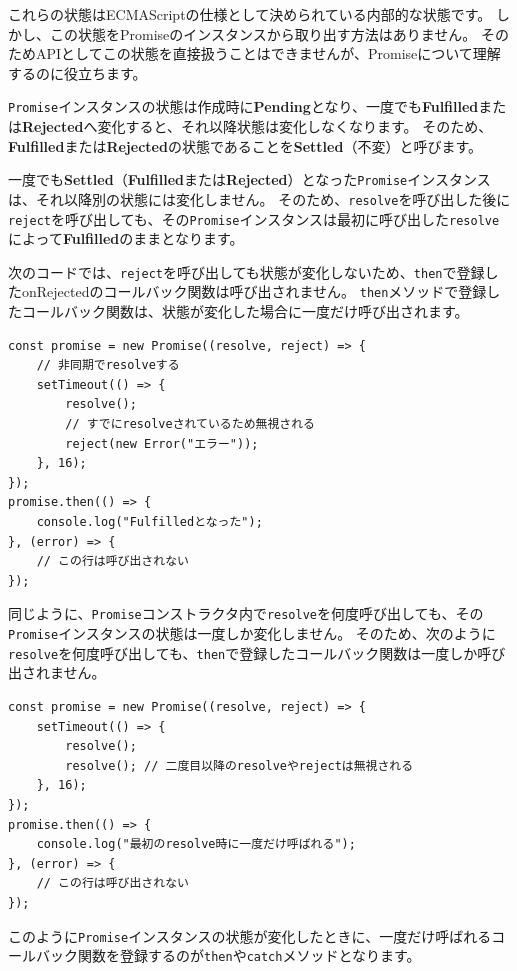 これらの状態はECMAScriptの仕様として決められている内部的な状態です。
しかし、この状態をPromiseのインスタンスから取り出す方法はありません。
そのためAPIとしてこの状態を直接扱うことはできませんが、Promiseについて理解するのに役立ちます。

\texttt{Promise}インスタンスの状態は作成時に\textbf{Pending}となり、一度でも\textbf{Fulfilled}または\textbf{Rejected}へ変化すると、それ以降状態は変化しなくなります。
そのため、\textbf{Fulfilled}または\textbf{Rejected}の状態であることを\textbf{Settled}（不変）と呼びます。

一度でも\textbf{Settled}（\textbf{Fulfilled}または\textbf{Rejected}）となった\texttt{Promise}インスタンスは、それ以降別の状態には変化しません。
そのため、\texttt{resolve}を呼び出した後に\texttt{reject}を呼び出しても、その\texttt{Promise}インスタンスは最初に呼び出した\texttt{resolve}によって\textbf{Fulfilled}のままとなります。

次のコードでは、\texttt{reject}を呼び出しても状態が変化しないため、\texttt{then}で登録したonRejectedのコールバック関数は呼び出されません。
\texttt{then}メソッドで登録したコールバック関数は、状態が変化した場合に一度だけ呼び出されます。

\begin{lstlisting}
const promise = new Promise((resolve, reject) => {
    // 非同期でresolveする
    setTimeout(() => {
        resolve();
        // すでにresolveされているため無視される
        reject(new Error("エラー"));
    }, 16);
});
promise.then(() => {
    console.log("Fulfilledとなった");
}, (error) => {
    // この行は呼び出されない
});
\end{lstlisting}

同じように、\texttt{Promise}コンストラクタ内で\texttt{resolve}を何度呼び出しても、その\texttt{Promise}インスタンスの状態は一度しか変化しません。
そのため、次のように\texttt{resolve}を何度呼び出しても、\texttt{then}で登録したコールバック関数は一度しか呼び出されません。

\begin{lstlisting}
const promise = new Promise((resolve, reject) => {
    setTimeout(() => {
        resolve();
        resolve(); // 二度目以降のresolveやrejectは無視される
    }, 16);
});
promise.then(() => {
    console.log("最初のresolve時に一度だけ呼ばれる");
}, (error) => {
    // この行は呼び出されない
});
\end{lstlisting}

このように\texttt{Promise}インスタンスの状態が変化したときに、一度だけ呼ばれるコールバック関数を登録するのが\texttt{then}や\texttt{catch}メソッドとなります。

